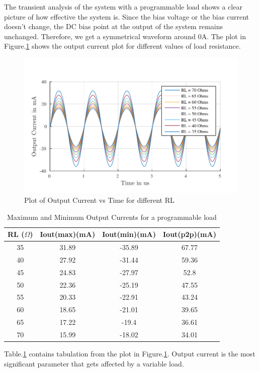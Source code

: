 The transient analysis of the system with a programmable load shows a clear picture of how effective the system is. Since the bias voltage or the bias current doesn't change, the DC bias point at the output of the system remains unchanged. Therefore, we get a symmetrical waveform around 0A. The plot in Figure.\ref{fig:RL_SINE} shows the output current plot for different values of load resistance. 
\begin{figure} [H]
\centering
\includegraphics[scale=1]{Figures/Plots/Ov_Sine_RL.pdf}
\caption{Plot of Output Current vs Time for different RL}
\label{fig:RL_SINE}
\end{figure}

\begin{table} [H]
\centering
\begin{tabular}{@{}cccc@{}}
\toprule
RL ($\Omega$)			& Iout(max)(mA)		& Iout(min)(mA)		& Iout(p2p)(mA) \\ \midrule
35					& 31.89 			& -35.89			& 67.77			\\
40					& 27.92 			& -31.44			& 59.36			\\
45					& 24.83 			& -27.97			& 52.8			\\
50					& 22.36 			& -25.19			& 47.55			\\
55					& 20.33 			& -22.91			& 43.24			\\
60					& 18.65 			& -21.01			& 39.65			\\
65					& 17.22 			& -19.4				& 36.61 		\\
70					& 15.99 			& -18.02			& 34.01			\\
\bottomrule
\end{tabular}
\caption{Maximum and Minimum Output Currents for a programmable load}
\label{tab:RL_trans_1}
\end{table}
Table.\ref{tab:RL_trans_1} contains tabulation from the plot in Figure.\ref{fig:RL_SINE}. Output current is the most significant parameter that gets affected by a variable load.

